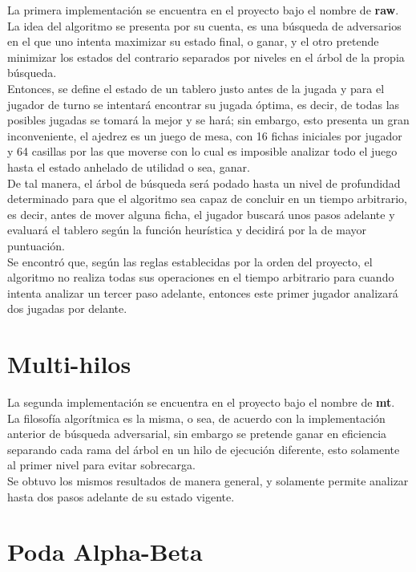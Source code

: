 \documentclass{llncs}
\begin{document}
\begin{multicols}{2}[]
La primera implementaci\'on se encuentra en el proyecto bajo el nombre de \textbf{raw}.\\
La idea del algoritmo se presenta por su cuenta, es una b\'usqueda de adversarios en el que uno intenta maximizar su estado final, o ganar,
y el otro pretende minimizar los estados del contrario separados por niveles en el \'arbol de la propia b\'usqueda.\\
Entonces, se define el estado de un tablero justo antes de la jugada y para el jugador de turno se intentar\'a encontrar su jugada \'optima,
es decir, de todas las posibles jugadas se tomar\'a la mejor y se har\'a; sin embargo, esto presenta un gran inconveniente, el ajedrez es un
juego de mesa, con 16 fichas iniciales por jugador y 64 casillas por las que moverse con lo cual es imposible analizar todo el juego hasta el
estado anhelado de utilidad o sea, ganar.\\
De tal manera, el \'arbol de b\'usqueda ser\'a podado hasta un nivel de profundidad determinado para que el algoritmo sea capaz de concluir
en un tiempo arbitrario, es decir, antes de mover alguna ficha, el jugador buscar\'a unos pasos adelante y evaluar\'a el tablero seg\'un la
funci\'on heur\'istica y decidir\'a por la de mayor puntuaci\'on.\\
Se encontr\'o que, seg\'un las reglas establecidas por la orden del proyecto, el algoritmo no realiza todas sus operaciones en el tiempo arbitrario
para cuando intenta analizar un tercer paso adelante, entonces este primer jugador analizar\'a dos jugadas por delante.


\section{Multi-hilos}\label{sec:Multi-hilos}

La segunda implementaci\'on se encuentra en el proyecto bajo el nombre de \textbf{mt}.\\
La filosof\'ia algor\'itmica es la misma, o sea, de acuerdo con la implementaci\'on anterior de b\'usqueda adversarial, sin embargo se pretende
ganar en eficiencia separando cada rama del \'arbol en un hilo de ejecuci\'on diferente, esto solamente al primer nivel para evitar sobrecarga.\\
Se obtuvo los mismos resultados de manera general, y solamente permite analizar hasta dos pasos adelante de su estado vigente.\\

\section{Poda Alpha-Beta}\label{sec:Alpha-Beta}


\end{multicols}
\end{document}
